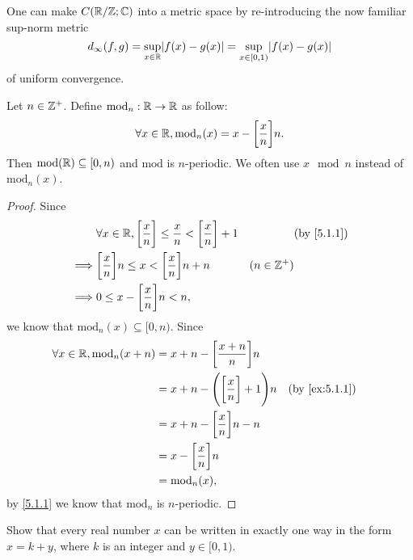 \begin{note}
  One can make \(C(\mathbb{R} / \mathbb{Z} ; \mathbb{C})\) into a metric space by re-introducing the now familiar sup-norm metric
  \[
    d_\infty(f, g) = \sup_{x \in \R} \abs{f(x) - g(x)} = \sup_{x \in [0, 1)} \abs{f(x) - g(x)}
  \]
  of uniform convergence.
\end{note}

\begin{ac}\label{ac:5.1.1}
  Let \(n \in \mathbb{Z}^+\).
  Define \(\text{mod}_n : \mathbb{R} \to \mathbb{R}\) as follow:
  \[
    \forall x \in \mathbb{R}, \text{mod}_n(x) = x - \bigg[\dfrac{x}{n}\bigg] n.
  \]
  Then \(\text{mod}(\mathbb{R}) \subseteq [0, n)\) and \(\text{mod}\) is \(n\)-periodic.
  We often use \(x \mod n\) instead of \(\text{mod}_n(x)\).
\end{ac}

\begin{proof}
  Since
  \begin{align*}
             & \forall x \in \R, \bigg[\dfrac{x}{n}\bigg] \leq \dfrac{x}{n} < \bigg[\dfrac{x}{n}\bigg] + 1 &              & \by{5.1.1} \\
    \implies & \bigg[\dfrac{x}{n}\bigg] n \leq x < \bigg[\dfrac{x}{n}\bigg] n + n                          & (n \in \Z^+)              \\
    \implies & 0 \leq x - \bigg[\dfrac{x}{n}\bigg] n < n,
  \end{align*}
  we know that \(\text{mod}_n(x) \subseteq [0, n)\).
  Since
  \begin{align*}
    \forall x \in \R, \text{mod}_n(x + n) & = x + n - \bigg[\dfrac{x + n}{n}\bigg] n                                \\
                                          & = x + n - \Bigg(\bigg[\dfrac{x}{n}\bigg] + 1\Bigg) n &  & \by{ex:5.1.1} \\
                                          & = x + n - \bigg[\dfrac{x}{n}\bigg] n - n                                \\
                                          & = x - \bigg[\dfrac{x}{n}\bigg] n                                        \\
                                          & = \text{mod}_n(x),
  \end{align*}
  by \cref{5.1.1} we know that \(\text{mod}_n\) is \(n\)-periodic.
\end{proof}

\exercisesection

\begin{ex}\label{ex:5.1.1}
  Show that every real number \(x\) can be written in exactly one way in the form \(x = k + y\), where \(k\) is an integer and \(y \in [0, 1)\).
\end{ex}

